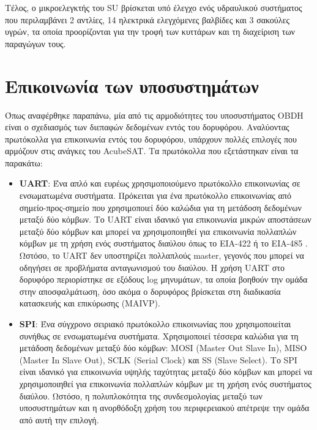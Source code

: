 \documentclass[a4paper,nobib,justified]{tufte-book}
\begin{document}
Τέλος, ο μικροελεγκτής του SU βρίσκεται υπό έλεγχο ενός υδραυλικού συστήματος που περιλαμβάνει 2 αντλίες, 14 ηλεκτρικά ελεγχόμενες βαλβίδες και 3 σακούλες υγρών, τα οποία προορίζονται για την τροφή των κυττάρων και τη διαχείριση των παραγώγων τους.

\section{Επικοινωνία των υποσυστημάτων}

Όπως αναφέρθηκε παραπάνω, μία από τις αρμοδιότητες του υποσυστήματος OBDH είναι ο σχεδιασμός των διεπαφών δεδομένων εντός του δορυφόρου. 
Αναλύοντας πρωτόκολλα για επικοινωνία εντός του δορυφόρου, υπάρχουν πολλές επιλογές που αρμόζουν στις ανάγκες του AcubeSAT. Τα πρωτόκολλα που εξετάστηκαν είναι τα παρακάτω:
\begin{itemize}
	\item \textbf{UART}: Ένα απλό και ευρέως χρησιμοποιούμενο πρωτόκολλο επικοινωνίας σε ενσωματωμένα συστήματα. Πρόκειται για ένα πρωτόκολλο επικοινωνίας από σημείο-προς-σημείο που χρησιμοποιεί δύο καλώδια για τη μετάδοση δεδομένων μεταξύ δύο κόμβων. Το UART είναι ιδανικό για επικοινωνία μικρών αποστάσεων μεταξύ δύο κόμβων και μπορεί να χρησιμοποιηθεί για επικοινωνία πολλαπλών κόμβων με τη χρήση ενός συστήματος διαύλου όπως το EIA-422 ή το EIA-485 \parencite{UARTNetworks}. Ωστόσο, το UART δεν υποστηρίζει πολλαπλούς master, γεγονός που μπορεί να οδηγήσει σε προβλήματα ανταγωνισμού του διαύλου. Η χρήση UART στο δορυφόρο περιορίστηκε σε εξόδους log μηνυμάτων, τα οποία βοηθούν την ομάδα στην αποσφαλμάτωση, όσο ακόμα ο δορυφόρος βρίσκεται στη διαδικασία κατασκευής και επικύρωσης (MAIVP).
	\item \textbf{SPI}: Ένα σύγχρονο σειριακό πρωτόκολλο επικοινωνίας που χρησιμοποιείται συνήθως σε ενσωματωμένα συστήματα. Χρησιμοποιεί τέσσερα καλώδια για τη μετάδοση δεδομένων μεταξύ δύο κόμβων: MOSI (Master Out Slave In), MISO (Master In Slave Out), SCLK (Serial Clock) και SS (Slave Select). Το SPI είναι ιδανικό για επικοινωνία υψηλής ταχύτητας μεταξύ δύο κόμβων και μπορεί να χρησιμοποιηθεί για επικοινωνία πολλαπλών κόμβων με τη χρήση ενός συστήματος διαύλου. Ωστόσο, η πολυπλοκότητα της συνδεσμολογίας μεταξύ των υποσυστημάτων και η ανορθόδοξη χρήση του περιφερειακού απέτρεψε την ομάδα από αυτή την επιλογή.

\end{itemize}
\end{document}
